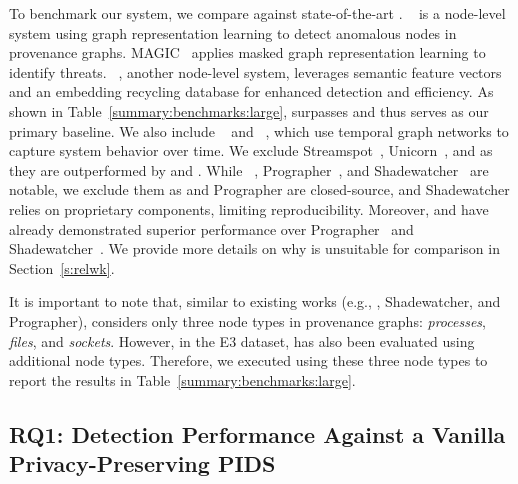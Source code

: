  To benchmark our system, we compare against state-of-the-art \pids. \threatrace~\cite{wang2022threatrace} is a node-level system using graph representation learning to detect anomalous nodes in provenance graphs. MAGIC~\cite{jia2023magic} applies masked graph representation learning to identify threats. \flash~\cite{flash2024}, another node-level system, leverages semantic feature vectors and an embedding recycling database for enhanced detection and efficiency. As shown in Table~\ref{summary:benchmarks:large}, \flash surpasses  and thus serves as our primary baseline. We also include \orthrus~\cite{jiang2025orthrus} and \kairos~\cite{cheng2023kairos}, which use temporal graph networks to capture system behavior over time. We exclude Streamspot~\cite{streamspot}, Unicorn~\cite{han2020unicorn}, and \threatrace as they are outperformed by \flash and \kairos. While \disdet~\cite{dong2023distdet}, Prographer~\cite{yangprographer}, and Shadewatcher~\cite{shadewatcher} are notable, we exclude them as \disdet and Prographer are closed-source, and Shadewatcher relies on proprietary components, limiting reproducibility. Moreover, \flash and \orthrus have already demonstrated superior performance over Prographer~\cite{yangprographer} and Shadewatcher~\cite{shadewatcher}. We provide more details on why \disdet is unsuitable for comparison in Section~\ref{s:relwk}.

It is important to note that, similar to existing works (e.g., \kairos, Shadewatcher, and Prographer), \Sys considers only three node types in provenance graphs: \emph{processes}, \emph{files}, and \emph{sockets}. However, in the E3 dataset, \flash has also been evaluated using additional node types. Therefore, we executed \flash using these three node types to report the results in Table~\ref{summary:benchmarks:large}.

\subsection{RQ1: Detection Performance Against a Vanilla Privacy-Preserving PIDS}
\label{sub:detect:perf:vanilla}



